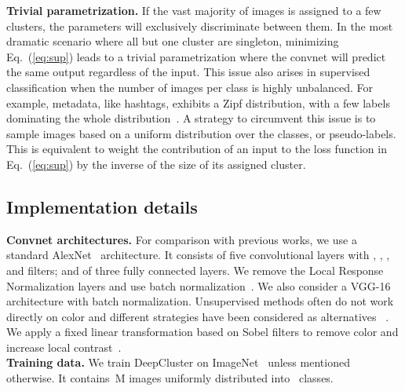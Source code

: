 \documentclass[runningheads]{llncs}
\def\OURS{DeepCluster\xspace}
\begin{document}
\noindent\textbf{Trivial parametrization.}
If the vast majority of images is assigned to a few clusters, the parameters  will exclusively discriminate between them.
In the most dramatic scenario where all but one cluster are singleton, minimizing Eq.~(\ref{eq:sup}) leads to a
trivial parametrization where the convnet will predict the same output regardless of the input.
This issue also arises in supervised classification when the number of images per class is highly unbalanced.
For example, metadata, like hashtags, exhibits a Zipf distribution, with a few labels dominating the whole distribution~\cite{joulin2016learning}.
A strategy to circumvent this issue is to sample images based on a uniform distribution over the classes, or pseudo-labels.
This is equivalent to weight the contribution of an input to the loss function in Eq.~(\ref{eq:sup}) by the inverse of the size of its assigned cluster.


\subsection{Implementation details}

\noindent\textbf{Convnet architectures.}
For comparison with previous works, we use a standard AlexNet~\cite{krizhevsky2012imagenet} architecture.
It consists of five convolutional layers with , , ,  and  filters; and of three fully connected layers.
We remove the Local Response Normalization layers and use batch normalization~\cite{ioffe2015batch}.
We also consider a VGG-16~\cite{simonyan2014very} architecture with batch normalization.
Unsupervised methods often do not work directly on color and different strategies have been considered as alternatives
~\cite{doersch2015unsupervised,noroozi2016unsupervised}.
We apply a fixed linear transformation based on Sobel filters to remove color and increase local contrast~\cite{bojanowski2017unsupervised,paulin2015local}.
\\

\noindent\textbf{Training data.}
We train \OURS on ImageNet~\cite{deng2009imagenet} unless mentioned otherwise.
It contains~M images uniformly distributed into~ classes.
\\
\end{document}
